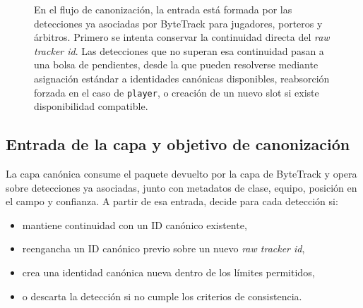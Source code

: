 \begin{figure}[H]
{
}%
\caption[Flujo de canonización de personas]{En el flujo de canonización, la entrada está formada por las detecciones ya asociadas por ByteTrack para jugadores, porteros y árbitros. Primero se intenta conservar la continuidad directa del \textit{raw tracker id}. Las detecciones que no superan esa continuidad pasan a una bolsa de pendientes, desde la que pueden resolverse mediante asignación estándar a identidades canónicas disponibles, reabsorción forzada en el caso de \texttt{player}, o creación de un nuevo slot si existe disponibilidad compatible.}
\label{fig:tracking_canonico_personas}
\end{figure}

\subsection{Entrada de la capa y objetivo de canonización}

La capa canónica consume el paquete devuelto por la capa de ByteTrack y opera sobre detecciones ya asociadas, junto con metadatos de clase, equipo, posición en el campo y confianza. A partir de esa entrada, decide para cada detección si:
\begin{itemize}
    \item mantiene continuidad con un ID canónico existente,
    \item reengancha un ID canónico previo sobre un nuevo \textit{raw tracker id},
    \item crea una identidad canónica nueva dentro de los límites permitidos,
    \item o descarta la detección si no cumple los criterios de consistencia.
\end{itemize}


